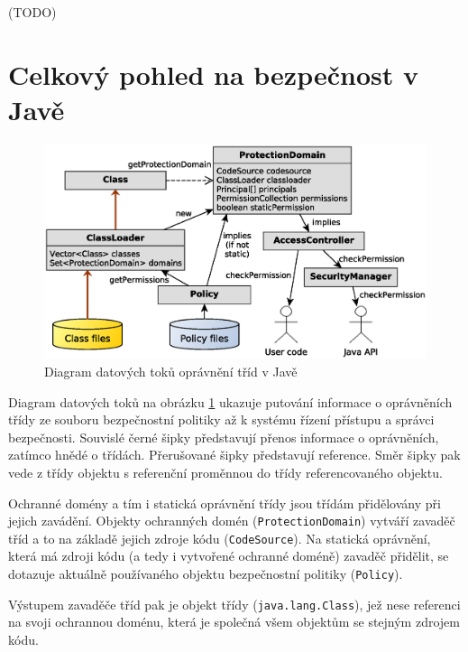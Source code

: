 (TODO)



\section{Celkový pohled na bezpečnost v Javě}

\begin{figure}[ht]
  \centering
  \includegraphics[width=14cm]{fig/domain-schema}
  \caption{Diagram datových toků oprávnění tříd v Javě}
  \label{diagramDatovychToku}
\end{figure}

Diagram datových toků na obrázku \ref{diagramDatovychToku} ukazuje putování informace o oprávněních třídy ze souboru bezpečnostní politiky až k systému řízení přístupu a správci bezpečnosti. Souvislé černé šipky představují přenos informace o oprávněních, zatímco hnědé o třídách. Přerušované šipky představují reference. Směr šipky pak vede z třídy objektu s referenční proměnnou do třídy referencovaného objektu.

Ochranné domény a tím i statická oprávnění třídy jsou třídám přidělovány při jejich zavádění. Objekty ochranných domén ({\tt ProtectionDomain}) vytváří zavaděč tříd a to na základě jejich zdroje kódu ({\tt CodeSource}). Na statická oprávnění, která má zdroji kódu (a tedy i vytvořené ochranné doméně) zavaděč přidělit, se dotazuje aktuálně používaného objektu bezpečnostní politiky ({\tt Policy}).

Výstupem zavaděče tříd pak je objekt třídy ({\tt java.lang.Class}), jež nese referenci na svoji ochrannou doménu, která je společná všem objektům se stejným zdrojem kódu.


